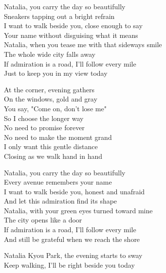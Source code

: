 \begin{lyrics}
Natalia, you carry the day so beautifully\\
Sneakers tapping out a bright refrain\\
I want to walk beside you, close enough to say\\
Your name without disguising what it means\\
Natalia, when you tease me with that sideways smile\\
The whole wide city falls away\\
If admiration is a road, I'll follow every mile\\
Just to keep you in my view today

At the corner, evening gathers\\
On the windows, gold and gray\\
You say, "Come on, don't lose me"\\
So I choose the longer way\\
No need to promise forever\\
No need to make the moment grand\\
I only want this gentle distance\\
Closing as we walk hand in hand

Natalia, you carry the day so beautifully\\
Every avenue remembers your name\\
I want to walk beside you, honest and unafraid\\
And let this admiration find its shape\\
Natalia, with your green eyes turned toward mine\\
The city opens like a door\\
If admiration is a road, I'll follow every mile\\
And still be grateful when we reach the shore

Natalia Kyou Park, the evening starts to sway\\
Keep walking, I'll be right beside you today
\end{lyrics}

